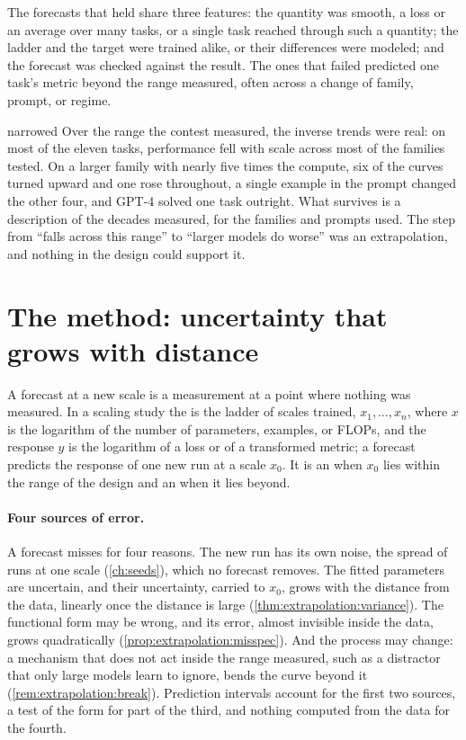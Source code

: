 \begin{refsection}
The forecasts that held share three features: the quantity was smooth, a loss or an average over many tasks, or a single task reached through such a quantity; the ladder and the target were trained alike, or their differences were modeled; and the forecast was checked against the result. The ones that failed predicted one task's metric beyond the range measured, often across a change of family, prompt, or regime.

\begin{verdict}{narrowed}
Over the range the contest measured, the inverse trends were real: on most of the eleven tasks, performance fell with scale across most of the families tested. On a larger family with nearly five times the compute, six of the curves turned upward and one rose throughout, a single example in the prompt changed the other four, and GPT-4 solved one task outright. What survives is a description of the decades measured, for the families and prompts used. The step from ``falls across this range'' to ``larger models do worse'' was an extrapolation, and nothing in the design could support it.
\end{verdict}

\section{The method: uncertainty that grows with distance}\label{sec:extrapolation:variance}

A forecast at a new scale is a measurement at a point where nothing was measured. In a scaling study the  is the ladder of scales trained, $x_1,\dots,x_n$, where $x$ is the logarithm of the number of parameters, examples, or FLOPs, and the response $y$ is the logarithm of a loss or of a transformed metric; a forecast predicts the response of one new run at a scale $x_0$. It is an  when $x_0$ lies within the range of the design and an  when it lies beyond.

\paragraph{Four sources of error.} A forecast misses for four reasons. The new run has its own noise, the spread of runs at one scale (\cref{ch:seeds}), which no forecast removes. The fitted parameters are uncertain, and their uncertainty, carried to $x_0$, grows with the distance from the data, linearly once the distance is large (\cref{thm:extrapolation:variance}). The functional form may be wrong, and its error, almost invisible inside the data, grows quadratically (\cref{prop:extrapolation:misspec}). And the process may change: a mechanism that does not act inside the range measured, such as a distractor that only large models learn to ignore, bends the curve beyond it (\cref{rem:extrapolation:break}). Prediction intervals account for the first two sources, a test of the form for part of the third, and nothing computed from the data for the fourth.


\end{refsection}
